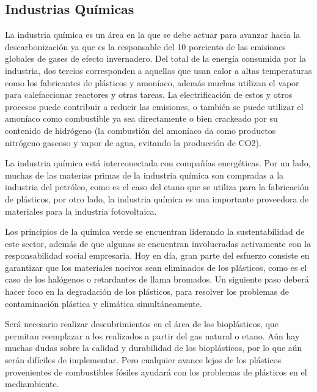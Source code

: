 \documentclass[runningheads]{llncs}
\begin{document}
\subsection{Industrias Químicas}
La industria química es un área en la que se debe actuar para avanzar hacia la descarbonización ya que es la responsable del 10 porciento de las emisiones globales de gases de efecto invernadero. Del total de la energía consumida por la industria, dos tercios corresponden a aquellas que usan calor a altas temperaturas como los fabricantes de plásticos y amoníaco, además muchas utilizan el vapor para calefaccionar reactores y otras tareas. La electrificación de estos y otros procesos puede contribuir a reducir las emisiones, o también se puede utilizar el amoníaco como combustible ya sea directamente o bien crackeado por su contenido de hidrógeno (la combustión del amoníaco da como productos nitrógeno gaseoso y vapor de agua, evitando la producción de CO2).

La industria química está interconectada con compañías energéticas. Por un lado, muchas de las materias primas de la industria química son compradas a la industria del petróleo, como es el caso del etano que se utiliza para la fabricación de plásticos, por otro lado, la industria química es una importante proveedora de materiales para la industria fotovoltaica.

Los principios de la química verde se encuentran liderando la sustentabilidad de este sector, además de que algunas se encuentran involucradas activamente con la responsabilidad social empresaria. Hoy en día, gran parte del esfuerzo consiste en garantizar que los materiales nocivos sean eliminados de los plásticos, como es el caso de los halógenos o retardantes de llama bromados. Un siguiente paso deberá hacer foco en la degradación de los plásticos, para resolver los problemas de contaminación plástica y climática simultáneamente.

Será necesario realizar descubrimientos en el área de los bioplásticos, que permitan reemplazar a los realizados a partir del gas natural o etano. Aún hay muchas dudas sobre la calidad y durabilidad de los bioplásticos, por lo que aún serán difíciles de implementar. Pero cualquier avance lejos de los plásticos provenientes de combustibles fósiles ayudará con los problemas de plásticos en el mediambiente.
\end{document}

